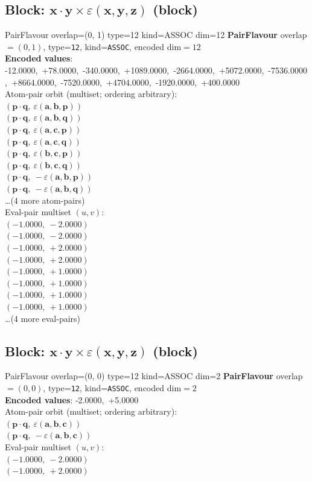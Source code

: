 \documentclass[a4paper,11pt]{article}
\newcommand{\pdcegfomjfhook}[2]{\mathbf{#1} \cdot \mathbf{#2}}
\newcommand{\kblbmcpggoncpf}[3]{\varepsilon(\mathbf{#1},\mathbf{#2},\mathbf{#3})}
\begin{document}
\subsection{Block: $\pdcegfomjfhook{x}{y} \times \kblbmcpggoncpf{x}{y}{z}$  (block)}
    PairFlavour  overlap=(0, 1)  type=12  kind=ASSOC  dim=12
\textbf{PairFlavour} overlap$=(0, 1)$, type=\texttt{12}, kind=\texttt{ASSOC}, encoded dim$=12$\\
\textbf{      Encoded values}: -12.0000,\ +78.0000,\ -340.0000,\ +1089.0000,\ -2664.0000,\ +5072.0000,\ -7536.0000,\ +8664.0000,\ -7520.0000,\ +4704.0000,\ -1920.0000,\ +400.0000\\
\quad Atom-pair orbit (multiset; ordering arbitrary):\\
$(\pdcegfomjfhook{p}{q},\ \kblbmcpggoncpf{a}{b}{p})$\\
$(\pdcegfomjfhook{p}{q},\ \kblbmcpggoncpf{a}{b}{q})$\\
$(\pdcegfomjfhook{p}{q},\ \kblbmcpggoncpf{a}{c}{p})$\\
$(\pdcegfomjfhook{p}{q},\ \kblbmcpggoncpf{a}{c}{q})$\\
$(\pdcegfomjfhook{p}{q},\ \kblbmcpggoncpf{b}{c}{p})$\\
$(\pdcegfomjfhook{p}{q},\ \kblbmcpggoncpf{b}{c}{q})$\\
$(\pdcegfomjfhook{p}{q},\ -\kblbmcpggoncpf{a}{b}{p})$\\
$(\pdcegfomjfhook{p}{q},\ -\kblbmcpggoncpf{a}{b}{q})$\\
\quad \ldots (4 more atom-pairs)\\
\quad Eval-pair multiset $(u, v)$:\\
$(-1.0000,\ -2.0000)$\\
$(-1.0000,\ -2.0000)$\\
$(-1.0000,\ +2.0000)$\\
$(-1.0000,\ +2.0000)$\\
$(-1.0000,\ +1.0000)$\\
$(-1.0000,\ +1.0000)$\\
$(-1.0000,\ +1.0000)$\\
$(-1.0000,\ +1.0000)$\\
\quad \ldots (4 more eval-pairs)\\

\subsection{Block: $\pdcegfomjfhook{x}{y} \times \kblbmcpggoncpf{x}{y}{z}$  (block)}
    PairFlavour  overlap=(0, 0)  type=12  kind=ASSOC  dim=2
\textbf{PairFlavour} overlap$=(0, 0)$, type=\texttt{12}, kind=\texttt{ASSOC}, encoded dim$=2$\\
\textbf{      Encoded values}: -2.0000,\ +5.0000\\
\quad Atom-pair orbit (multiset; ordering arbitrary):\\
$(\pdcegfomjfhook{p}{q},\ \kblbmcpggoncpf{a}{b}{c})$\\
$(\pdcegfomjfhook{p}{q},\ -\kblbmcpggoncpf{a}{b}{c})$\\
\quad Eval-pair multiset $(u, v)$:\\
$(-1.0000,\ -2.0000)$\\
$(-1.0000,\ +2.0000)$\\
\end{document}
